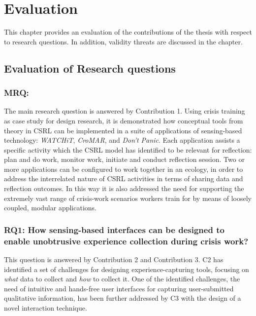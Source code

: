 \chapter{Evaluation}\label{evaluation}


This chapter provides an evaluation of the contributions of the thesis with respect to research questions. In addition, validity threats are discussed in the chapter.

\section{Evaluation of Research questions}\label{evaluation-of-research-questions}

\subsection{MRQ: \MRQ}\label{mrq-what-are-the-opportunities-introduced-by-combining-reflective-learning-theories-with-sensing-based-interfaces-for-supporting-crisis-training}

The main research question is answered by Contribution 1. Using crisis training as case study for design research, it is demonstrated how conceptual tools from theory in CSRL can be implemented in a suite of applications of sensing-based technology: \emph{WATCHiT}, \emph{CroMAR}, and \emph{Don't Panic}. Each application assists a specific activity which the CSRL model has identified to be relevant for reflection: plan and do work, monitor work, initiate and conduct reflection session. Two or more applications can be configured to work together in an ecology, in order to address the interrelated nature of CSRL activities in terms of sharing data and reflection outcomes. In this way it is also addressed the need for supporting the extremely vast range of crisis-work scenarios workers train for by means of loosely coupled, modular applications.

\subsection{RQ1: How sensing-based interfaces can be designed to enable unobtrusive experience collection during crisis work?}\label{rq1-how-sensing-based-interfaces-can-be-designed-to-enable-unobtrusive-experience-collection-during-crisis-work}

This question is answered by Contribution 2 and Contribution 3. C2 has identified a set of challenges for designing experience-capturing tools, focusing on \emph{what} data to collect and \emph{how} to collect it. One of the identified challenges, the need of intuitive and hands-free user interfaces for capturing user-submitted qualitative information, has been further addressed by C3 with the design of a novel interaction technique.

